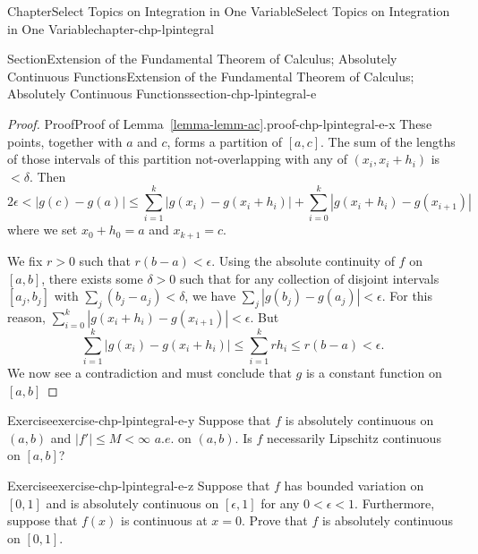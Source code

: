 \documentclass[oneside,10pt,]{book}
\newcommand{\xreffont}{\relax}
\numberwithin{equation}{section}
\begin{document}
\begin{chapterptx}{Chapter}{Select Topics on Integration in One Variable}{}{Select Topics on Integration in One Variable}{}{}{chapter-chp-lpintegral}
\begin{sectionptx}{Section}{Extension of the Fundamental Theorem of Calculus; Absolutely Continuous Functions}{}{Extension of the Fundamental Theorem of Calculus; Absolutely Continuous Functions}{}{}{section-chp-lpintegral-e}
\begin{proof}{Proof}{Proof of Lemma~{\xreffont\ref*{lemma-lemm-ac}}.}{proof-chp-lpintegral-e-x}
These points, together with \(a \) and \(c\), forms a partition of \([a, c]\). The sum of the lengths of those intervals of this partition not-overlapping with any of \((x_{i}, x_{i}+h_{i})\) is \(< \delta\). Then%
\begin{equation*}
2\epsilon < |g(c)-g(a)| \le \sum_{i=1}^{k} |g(x_{i})-g(x_{i}+h_{i})| + \sum_{i=0}^{k} |g(x_{i}+h_{i})-g(x_{i+1})|
\end{equation*}
where we set \(x_{0}+h_{0}=a\) and \(x_{k+1}=c\).%
\par
We fix \(r > 0\) such that \(r(b-a) < \epsilon\). Using the absolute continuity of \(f\) on \([a, b]\), there exists some \(\delta > 0\) such that for any collection of disjoint intervals \([a_{j}, b_{j}]\) with \(\sum_{j} (b_{j}-a_{j}) < \delta\), we have \(\sum_{j}|g(b_{j})-g(a_{j})| < \epsilon\). For this reason, \(\sum_{i=0}^{k} |g(x_{i}+h_{i})-g(x_{i+1})| < \epsilon\). But%
\begin{equation*}
\sum_{i=1}^{k} |g(x_{i})-g(x_{i}+h_{i})| \le \sum_{i=1}^{k}r h_{i} \le r(b-a) < \epsilon.
\end{equation*}
We now see a contradiction and must conclude that \(g\) is a constant function on \([a, b]\)%
\end{proof}
\begin{inlineexercise}{Exercise}{}{exercise-chp-lpintegral-e-y}%
Suppose that  \(f\) is absolutely continuous on  \((a, b)\) and \(|f'|\le M < \infty\) \(a.e.\) on \((a, b)\). Is \(f\) necessarily Lipschitz continuous on \([a, b]\)?%
\end{inlineexercise}%
\begin{inlineexercise}{Exercise}{}{exercise-chp-lpintegral-e-z}%
Suppose that  \(f\) has bounded variation on \([0, 1]\) and is absolutely continuous on  \([\epsilon ,1]\) for any \(0 < \epsilon < 1\). Furthermore, suppose that \(f(x)\) is continuous at \(x=0\). Prove that \(f\) is absolutely continuous on  \([0 ,1]\).%
\end{inlineexercise}%
\end{sectionptx}
\end{chapterptx}
%
%
\typeout{************************************************}
\typeout{************************************************}
%
\end{document}
